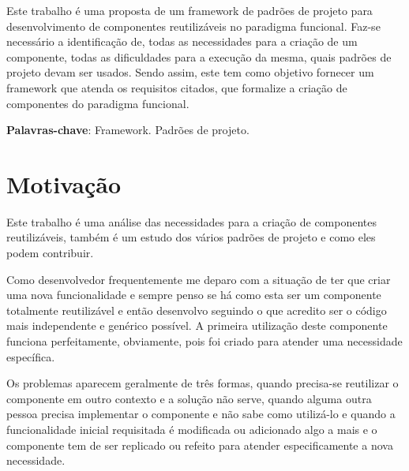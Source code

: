 \documentclass[
	12pt,				%
 	oneside,			%
 	openany,
	a4paper,			%
	english,			%
	french,				%
	spanish,			%
	brazil				%
	]{abntex2}
\begin{document}

\frenchspacing

\pretextual
\imprimircapa
\imprimirfolhaderosto*


\setlength{\absparsep}{18pt} %
\begin{resumo}
Este trabalho é uma proposta de um framework de padrões de projeto para desenvolvimento de componentes reutilizáveis no paradigma funcional. Faz-se necessário a identificação de, todas as necessidades para a criação de um componente, todas as dificuldades para a execução da mesma, quais padrões de projeto devam ser usados. Sendo assim, este tem como objetivo fornecer um framework que atenda os requisitos citados, que formalize a criação de componentes do paradigma funcional.

\textbf{Palavras-chave}: Framework. Padrões de projeto.
\end{resumo}

\tableofcontents*
\cleardoublepage

\textual

\chapter{Motivação}

Este trabalho é uma análise das necessidades para a criação de componentes reutilizáveis, também é um estudo dos vários padrões de projeto e como eles podem contribuir.

Como desenvolvedor frequentemente me deparo com a situação de ter que criar uma nova funcionalidade e sempre penso se há como esta ser um componente totalmente reutilizável e então desenvolvo seguindo o que acredito ser o código mais independente e genérico possível. A primeira utilização deste componente funciona perfeitamente, obviamente, pois foi criado para atender uma necessidade específica. 

Os problemas aparecem geralmente de três formas, quando precisa-se reutilizar o componente em outro contexto e a solução não serve, quando alguma outra pessoa precisa implementar o componente e não sabe como utilizá-lo e quando a funcionalidade inicial requisitada é modificada ou adicionado algo a mais e o componente tem de ser replicado ou refeito para atender especificamente a nova necessidade.
\end{document}
